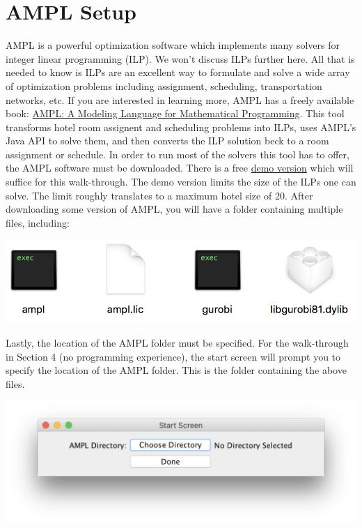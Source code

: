 \documentclass[11 pt]{article}
\begin{document}
\newpage

\section{AMPL Setup}

AMPL is a powerful optimization software which implements many solvers for integer linear programming (ILP). We won't discuss ILPs further here. All that is needed to know is ILPs are an excellent way to formulate and solve a wide array of optimization problems including assignment, scheduling, transportation networks, etc. If you are interested in learning more, AMPL has a freely available book: \href{https://ampl.com/resources/the-ampl-book/}{AMPL: A Modeling Language
for Mathematical Programming}. This tool transforms hotel room assignent and scheduling problems into ILPs, uses AMPL's Java API to solve them, and then converts the ILP solution beck to a room assignment or schedule. In order to run most of the solvers this tool has to offer, the AMPL software must be downloaded. There is a free \href{https://ampl.com/try-ampl/download-a-free-demo/}{demo version} which will suffice for this walk-through. The demo version limits the size of the ILPs one can solve. The limit roughly translates to a maximum hotel size of 20. After downloading some version of AMPL, you will have a folder containing multiple files, including:
\begin{center}
    \includegraphics[scale=0.7]{images/amplFiles.png}
\end{center}
Lastly, the location of the AMPL folder must be specified. For the walk-through in Section 4 (no programming experience), the start screen will prompt you to specify the location of the AMPL folder. This is the folder containing the above files.
\begin{center}
\includegraphics[scale=0.5]{images/startScreen.png}
\end{center}
\end{document}
